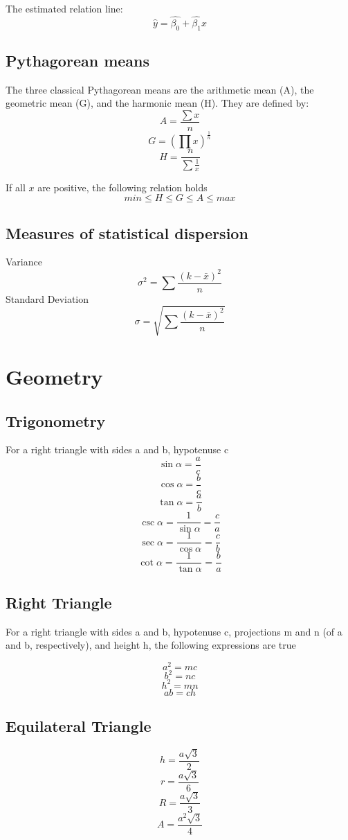 \documentclass[oneside]{book} %
\theoremstyle{plain}
\newcommand*\mean[1]{\bar{#1}}
\newcommand*\reciprocal[1]{\frac{1}{#1}}
\begin{document}
The estimated relation line:
\[\hat y = \hat {\beta_0} + \hat {\beta_1} x\]

\section{Pythagorean means}
The three classical Pythagorean means are the arithmetic mean (A), the
geometric mean (G), and the harmonic mean (H). They are defined by:
\[A = \frac{\sum{x}}{n}\]
\[G = \left( \prod{x} \right) ^ \reciprocal{n}\]
\[H = \frac{n}{\sum{\reciprocal{x}}}\]

If all \(x\) are positive, the following relation holds
\[min \le H \le G \le A \le max\]

\section{Measures of statistical dispersion}
Variance
\[\sigma^2 = \sum \frac{\left ( k-\mean{x} \right ) ^ 2}{n}\]
Standard Deviation
\[\sigma = \sqrt{\sum \frac{\left ( k-\mean{x} \right ) ^ 2}{n}}\]


\chapter{Geometry}

\section{Trigonometry}

For a right triangle with sides a and b, hypotenuse c
\[\sin{\alpha} = \frac{a}{c}\]
\[\cos{\alpha} = \frac{b}{c}\]
\[\tan{\alpha} = \frac{a}{b}\]
\[\csc{\alpha} = \reciprocal{\sin{\alpha}} = \frac{c}{a}\]
\[\sec{\alpha} = \reciprocal{\cos{\alpha}} = \frac{c}{b}\]
\[\cot{\alpha} = \reciprocal{\tan{\alpha}} = \frac{b}{a}\]


\section{Right Triangle}
For a right triangle with sides a and b, hypotenuse c, projections m and n (of
a and b, respectively), and height h,
the following expressions are true

\[a^2 = m c\]
\[b^2 = n c\]
\[h^2 = m n\]
\[a b = c h\]

\section{Equilateral Triangle}
\[h = \frac{a \sqrt{3}}{2}\]
\[r = \frac{a \sqrt{3}}{6}\]
\[R = \frac{a \sqrt{3}}{3}\]
\[A = \frac{a^2 \sqrt{3}}{4}\]
\end{document}
